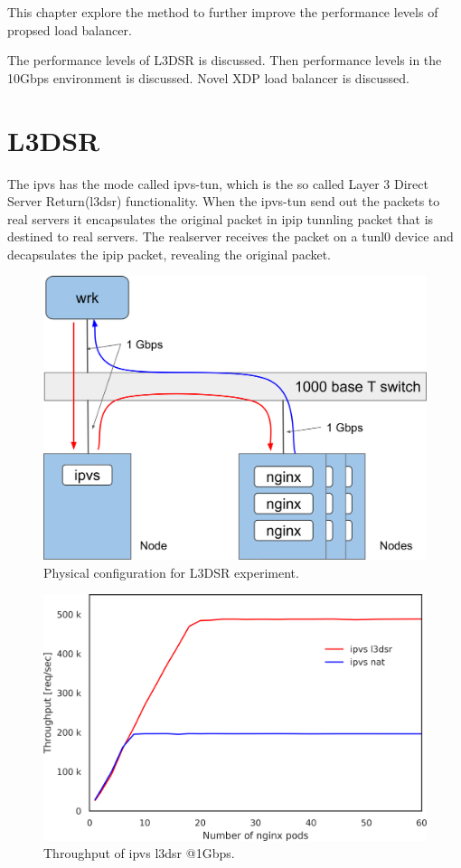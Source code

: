 This chapter explore the method to further improve the performance levels of propsed load balancer.

The performance levels of L3DSR is discussed.
Then performance levels in the 10Gbps environment is discussed.
Novel XDP load balancer is discussed.


\section{L3DSR}

The ipvs has the mode called ipvs-tun, which is the so called Layer 3 Direct Server Return(l3dsr) functionality.
When the ipvs-tun send out the packets to real servers it encapsulates the original packet in ipip tunnling packet that is destined to real servers.
The realserver receives the packet on a tunl0 device and decapsulates the ipip packet, revealing the original packet.

\begin{figure}[h]
  \centering
  \includegraphics[width=0.8\columnwidth]{Figs/bench_1g_l3dsr}
  \caption{Physical configuration for L3DSR experiment.}
  \label{fig:bench_1g_l3dsr}
\end{figure}

\begin{figure}[h]
  \centering
  \includegraphics[width=0.8\columnwidth]{Figs/ipvs_l3dsr_1g.png}
  \caption{Throughput of ipvs l3dsr @1Gbps.}
  \label{fig:ipvs_l3dsr_1g.png}
\end{figure}

